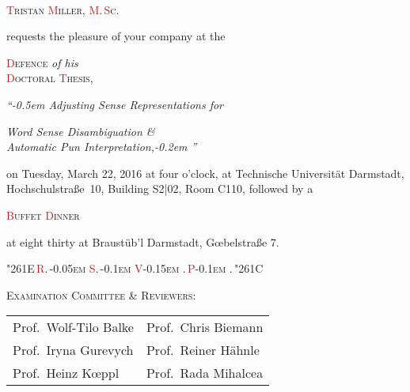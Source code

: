 \documentclass[12pt,a4paper]{article}
\newcommand{\h}[1]{\textcolor{FireBrick}{#1}}
\begin{document}
\mbox{~}\newpage
{}
\centering

\mbox{}

\vfill

{\huge {\textsc{\h{T}ristan \h{M}iller{\small, \h{M}.\,\h{S}c.}}}}

\bigskip

requests the pleasure of your company at the

\medskip

{\huge {\textsc{\h{D}efence} {\LARGE \emph{of his}}\\[0.4ex] \textsc{\h{D}octoral \h{T}hesis,}}}

\bigskip

{\Large \emph{``\kern-0.5em Adjusting Sense {R}epresentations for}

\emph{Word Sense Disambiguation \&}\\[0.45ex]

\emph{Automatic Pun Interpretation,\kern-0.2em ''}}

\bigskip

on Tuesday, March 22, 2016 at four o'clock,
at Technische Universität Darmstadt, Hochschulstraße~10, Building S2|02, Room C110, followed by a

\bigskip

{\huge \textsc{\h{B}uffet \h{D}inner}}

\bigskip

at eight thirty at Braustüb'l Darmstadt, Gœbelstraße 7.

\bigskip \bigskip

{\Huge \char"261E\,\textsc{\h{R}.\,\kern-0.05em \h{S}.\,\kern-0.1em \h{V}\kern-0.15em .\,\h{P}\kern-0.1em .\,\char"261C}}

\bigskip \bigskip

\textsc{Examination Committee \& Reviewers:}

\medskip

{\small\em%
\begin{tabular}{ll}
Prof.~Wolf-Tilo Balke & Prof.~Chris Biemann \\
Prof.~Iryna Gurevych  & Prof.~Reiner Hähnle \\
Prof.~Heinz Kœppl     & Prof.~Rada Mihalcea \\
\end{tabular}%
}

\vfill
\end{document}
